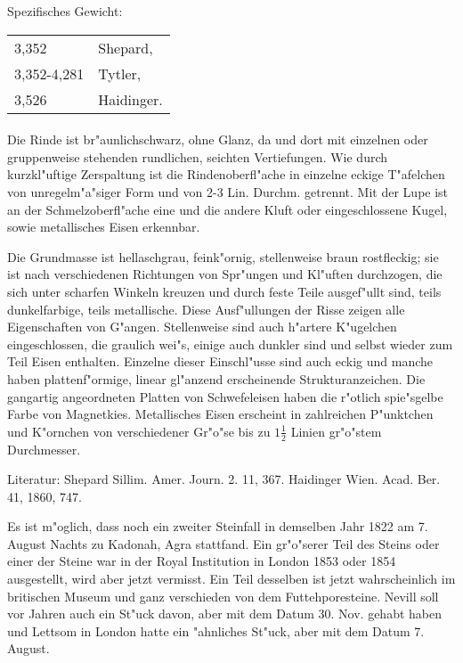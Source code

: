\documentclass[a4paper, 11pt, oneside]{article}
\begin{document}
Spezifisches Gewicht:
\begin{table}[!ht]
    \centering
    \begin{tabular}{l l}
        3,352 & Shepard,\\
        3,352-4,281 & Tytler,\\
        3,526 & Haidinger.
    \end{tabular}
\end{table}
\paragraph{}
Die Rinde ist br"aunlichschwarz, ohne Glanz, da und dort mit einzelnen oder gruppenweise stehenden rundlichen, seichten Vertiefungen. Wie durch kurzkl"uftige Zerspaltung ist die Rindenoberfl"ache in einzelne eckige T"afelchen von unregelm"a"siger Form und von 2-3 Lin. Durchm. getrennt. Mit der Lupe ist an der Schmelzoberfl"ache eine und die andere Kluft oder eingeschlossene Kugel, sowie metallisches Eisen erkennbar.

Die Grundmasse ist hellaschgrau, feink"ornig, stellenweise braun rostfleckig; sie ist nach verschiedenen Richtungen von Spr"ungen und Kl"uften durchzogen, die sich unter scharfen Winkeln kreuzen und durch feste Teile ausgef"ullt sind, teils dunkelfarbige, teils metallische. Diese Ausf"ullungen der Risse zeigen alle Eigenschaften von G"angen. Stellenweise sind auch h"artere K"ugelchen eingeschlossen, die graulich wei"s, einige auch dunkler sind und selbst wieder zum Teil Eisen enthalten. Einzelne dieser Einschl"usse sind auch eckig und manche haben plattenf"ormige, linear gl"anzend erscheinende Strukturanzeichen. Die gangartig angeordneten Platten von Schwefeleisen haben die r"otlich spie"sgelbe Farbe von Magnetkies. Metallisches Eisen erscheint in zahlreichen P"unktchen und K"ornchen von verschiedener Gr"o"se bis zu $1\frac{1}{2}$ Linien gr"o"stem Durchmesser.

\footnotesize
Literatur: Shepard Sillim. Amer. Journ. 2. 11, 367. Haidinger Wien. Acad. Ber. 41, 1860, 747.

\normalsize
Es ist m"oglich, dass noch ein zweiter Steinfall in demselben Jahr 1822 am 7. August Nachts zu Kadonah, Agra stattfand. Ein gr"o"serer Teil des Steins oder einer der Steine war in der Royal Institution in London 1853 oder 1854 ausgestellt, wird aber jetzt vermisst. Ein Teil desselben ist jetzt wahrscheinlich im britischen Museum und ganz verschieden von dem Futtehporesteine. Nevill soll vor Jahren auch ein St"uck davon, aber mit dem Datum 30. Nov. gehabt haben und Lettsom in London hatte ein "ahnliches St"uck, aber mit dem Datum 7. August.
\end{document}
